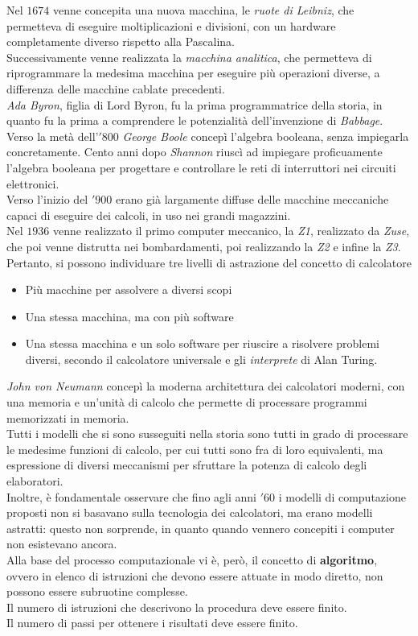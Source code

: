 \documentclass[a4paper]{extarticle}
\begin{document}
Nel \(1674\) venne concepita una nuova macchina, le \textit{ruote di Leibniz}, che permetteva di eseguire moltiplicazioni e divisioni, con un hardware completamente diverso rispetto alla Pascalina.\\
Successivamente venne realizzata la \textit{macchina analitica}, che permetteva di riprogrammare la medesima macchina per eseguire più operazioni diverse, a differenza delle macchine cablate precedenti.\\
\textit{Ada Byron}, figlia di Lord Byron, fu la prima programmatrice della storia, in quanto fu la prima a comprendere le potenzialità dell'invenzione di \textit{Babbage}.\\
Verso la metà dell'\('800\) \textit{George Boole} concepì l'algebra booleana, senza impiegarla concretamente. Cento anni dopo \textit{Shannon} riuscì ad impiegare proficuamente l'algebra booleana per progettare e controllare le reti di interruttori nei circuiti elettronici.\\
Verso l'inizio del \('900\) erano già largamente diffuse delle macchine meccaniche capaci di eseguire dei calcoli, in uso nei grandi magazzini.\\
Nel \(1936\) venne realizzato il primo computer meccanico, la \textit{Z1}, realizzato da \textit{Zuse}, che poi venne distrutta nei bombardamenti, poi realizzando la \textit{Z2} e infine la \textit{Z3}.\\
Pertanto, si possono individuare tre livelli di astrazione del concetto di calcolatore
\begin{itemize}
    \item Più macchine per assolvere a diversi scopi
    \item Una stessa macchina, ma con più software
    \item Una stessa macchina e un solo software per riuscire a risolvere problemi diversi, secondo il calcolatore universale e gli \textit{interprete} di Alan Turing.
\end{itemize}
\textit{John von Neumann} concepì la moderna architettura dei calcolatori moderni, con una memoria e un'unità di calcolo che permette di processare programmi memorizzati in memoria.\\
Tutti i modelli che si sono susseguiti nella storia sono tutti in grado di processare le medesime funzioni di calcolo, per cui tutti sono fra di loro equivalenti, ma espressione di diversi meccanismi per sfruttare la potenza di calcolo degli elaboratori.\\
Inoltre, è fondamentale osservare che fino agli anni \('60\) i modelli di computazione proposti non si basavano sulla tecnologia dei calcolatori, ma erano modelli astratti: questo non sorprende, in quanto quando vennero concepiti i computer non esistevano ancora.\\
Alla base del processo computazionale vi è, però, il concetto di \textbf{algoritmo}, ovvero in elenco di istruzioni che devono essere attuate in modo diretto, non possono essere subruotine complesse.\\
Il numero di istruzioni che descrivono la procedura deve essere finito.\\
Il numero di passi per ottenere i risultati deve essere finito.
\end{document}
